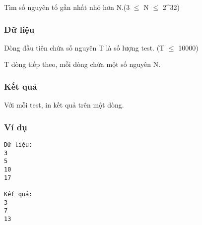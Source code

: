 



   Tìm số nguyên tố gần nhất nhỏ hơn N.(3  $\le$  N  $\le$  2\textasciicircum32)  

\subsubsection{   Dữ liệu  }

   Dòng đầu tiên chứa số nguyên T là số lượng test. (T  $\le$  10000)  

   T dòng tiếp theo, mỗi dòng chứa một số nguyên N.  

\subsubsection{   Kết quả  }

   Với mỗi test, in kết quả trên một dòng.  

\subsubsection{   Ví dụ  }
\begin{verbatim}
Dữ liệu:
3
5 
10
17

Kết quả:
3
7
13
\end{verbatim}
